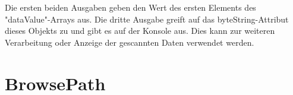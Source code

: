 Die ersten beiden Ausgaben geben den Wert des ersten Elements des "dataValue"-Arrays aus. Die dritte Ausgabe greift auf das byteString-Attribut dieses Objekts zu und gibt es auf der Konsole aus. Dies kann zur weiteren Verarbeitung oder Anzeige der gescannten Daten verwendet werden.\\


\section{BrowsePath}